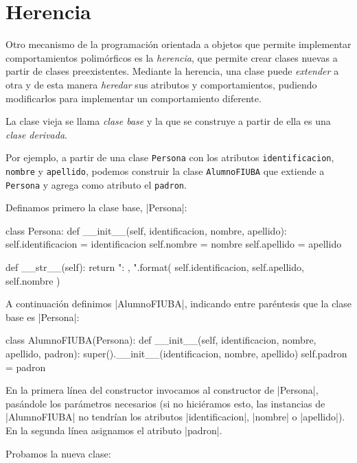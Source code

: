 \section{Herencia}

Otro mecanismo de la programación orientada a objetos que permite implementar
comportamientos polimórficos es la {\it herencia}, que permite crear clases
nuevas a partir de clases preexistentes.  Mediante la herencia, una clase puede
{\it extender} a otra y de esta manera {\it heredar} sus atributos y
comportamientos, pudiendo modificarlos para implementar un comportamiento
diferente.

La clase vieja se llama {\it clase base} y la que se construye a partir de
ella es una {\it clase derivada}.

Por ejemplo, a partir de una clase \lstinline!Persona! con los atributos
\lstinline!identificacion!, \lstinline!nombre! y \lstinline!apellido!,
podemos construir la clase \lstinline!AlumnoFIUBA! que extiende a
\lstinline!Persona! y agrega como atributo el \lstinline!padron!.

Definamos primero la clase base, |Persona|:

\begin{codigo-python-sn}
class Persona:
    def __init__(self, identificacion, nombre, apellido):
        self.identificacion = identificacion
        self.nombre = nombre
        self.apellido = apellido

    def __str__(self):
        return "{}: {}, {}".format(
            self.identificacion, self.apellido, self.nombre
        )
\end{codigo-python-sn}

A continuación definimos |AlumnoFIUBA|, indicando entre paréntesis que la clase
base es |Persona|:

\begin{codigo-python-sn}
class AlumnoFIUBA(Persona):
    def __init__(self, identificacion, nombre, apellido, padron):
        super().__init__(identificacion, nombre, apellido)
        self.padron = padron
\end{codigo-python-sn}

En la primera línea del constructor invocamos al constructor de |Persona|,
pasándole los parámetros necesarios (si no hiciéramos esto, las instancias de
|AlumnoFIUBA| no tendrían los atributos |identificacion|, |nombre| o
|apellido|). En la segunda línea asignamos el atributo |padron|.

Probamos la nueva clase:


